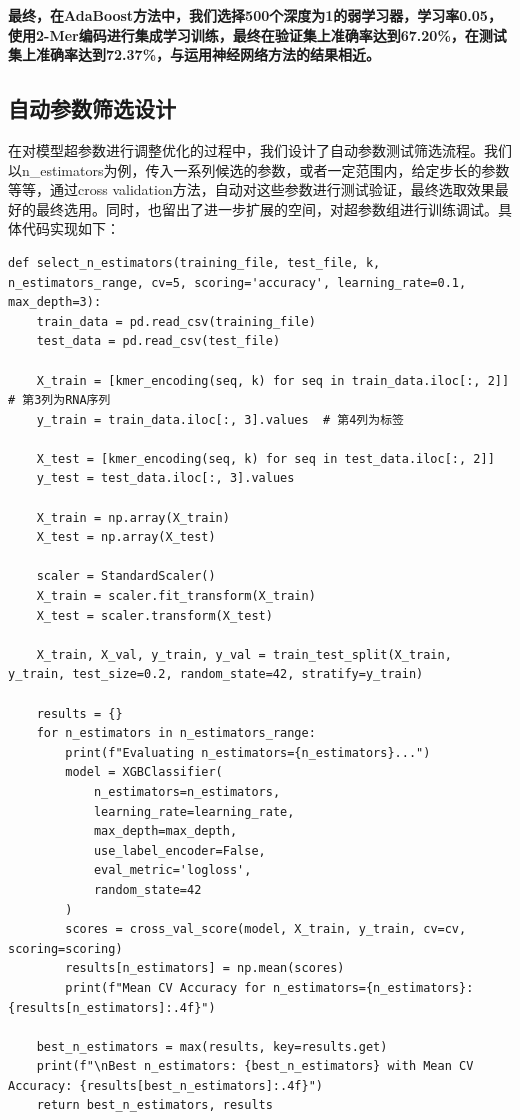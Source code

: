 \documentclass[a4paper,11pt,AutoFakeBold]{ctexart}
\begin{document}
\textbf{最终，在AdaBoost方法中，我们选择500个深度为1的弱学习器，学习率0.05，使用2-Mer编码进行集成学习训练，最终在验证集上准确率达到67.20\%，在测试集上准确率达到72.37\%，与运用神经网络方法的结果相近。}

\subsection{自动参数筛选设计}
在对模型超参数进行调整优化的过程中，我们设计了自动参数测试筛选流程。我们以n\_estimators为例，传入一系列候选的参数，或者一定范围内，给定步长的参数等等，通过cross validation方法，自动对这些参数进行测试验证，最终选取效果最好的最终选用。同时，也留出了进一步扩展的空间，对超参数组进行训练调试。具体代码实现如下：

\begin{lstlisting}
def select_n_estimators(training_file, test_file, k, n_estimators_range, cv=5, scoring='accuracy', learning_rate=0.1, max_depth=3):
    train_data = pd.read_csv(training_file)
    test_data = pd.read_csv(test_file)

    X_train = [kmer_encoding(seq, k) for seq in train_data.iloc[:, 2]]  # 第3列为RNA序列
    y_train = train_data.iloc[:, 3].values  # 第4列为标签
    
    X_test = [kmer_encoding(seq, k) for seq in test_data.iloc[:, 2]]
    y_test = test_data.iloc[:, 3].values

    X_train = np.array(X_train)
    X_test = np.array(X_test)

    scaler = StandardScaler()
    X_train = scaler.fit_transform(X_train)
    X_test = scaler.transform(X_test)

    X_train, X_val, y_train, y_val = train_test_split(X_train, y_train, test_size=0.2, random_state=42, stratify=y_train)
    
    results = {}
    for n_estimators in n_estimators_range:
        print(f"Evaluating n_estimators={n_estimators}...")
        model = XGBClassifier(
            n_estimators=n_estimators,
            learning_rate=learning_rate,
            max_depth=max_depth,
            use_label_encoder=False,
            eval_metric='logloss',
            random_state=42
        )
        scores = cross_val_score(model, X_train, y_train, cv=cv, scoring=scoring)
        results[n_estimators] = np.mean(scores)
        print(f"Mean CV Accuracy for n_estimators={n_estimators}: {results[n_estimators]:.4f}")

    best_n_estimators = max(results, key=results.get)
    print(f"\nBest n_estimators: {best_n_estimators} with Mean CV Accuracy: {results[best_n_estimators]:.4f}")
    return best_n_estimators, results

\end{lstlisting}
\end{document}
